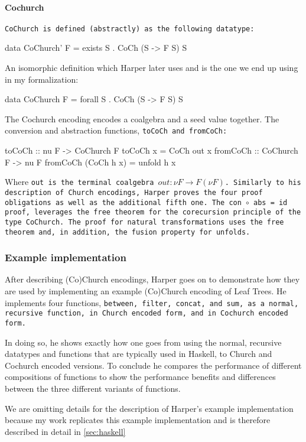 \paragraph{Cochurch} \tt{CoChurch} is defined (abstractly) as the following datatype:
\begin{code}
data CoChurch' F = exists S . CoCh (S -> F S) S
\end{code}
An isomorphic definition which Harper later uses and is the one we end up using in my formalization:
\begin{code}
data CoChurch F = forall S . CoCh (S -> F S) S
\end{code}
The Cochurch encoding encodes a coalgebra and a seed value together.
The conversion and abstraction functions, \tt{toCoCh} and \tt{fromCoCh}:
\begin{code}
toCoCh :: nu F -> CoChurch F
toCoCh x = CoCh out x
fromCoCh :: CoChurch F -> nu F
fromCoCh (CoCh h x) = unfold h x  
\end{code}
Where \tt{out} is the terminal coalgebra $out : \nu F \to F(\nu F)$. Similarly to his description of Church encodings, Harper proves the four proof obligations as well as the additional fifth one.
The \tt{con $\circ$ abs = id} proof, leverages the free theorem for the corecursion principle of the type \tt{CoChurch}.
The proof for natural transformations uses the free theorem and, in addition, the fusion property for unfolds.

\subsubsection{Example implementation}
After describing (Co)Church encodings, Harper goes on to demonstrate how they are used by implementing an example (Co)Church encoding of Leaf Trees.
He implements four functions, \tt{between}, \tt{filter}, \tt{concat}, and \tt{sum}, as a normal, recursive function, in Church encoded form, and in Cochurch encoded form.

In doing so, he shows exactly how one goes from using the normal, recursive datatypes and functions that are typically used in Haskell, to Church and Cochurch encoded versions.
To conclude he compares the performance of different compositions of functions to show the performance benefits and differences between the three different variants of functions.

We are omitting details for the description of Harper's example implementation because my work replicates this example implementation and is therefore described in detail in \autoref{sec:haskell}


\iffalse
\begin{itemize}
    \Item 
\end{itemize}
\fi
